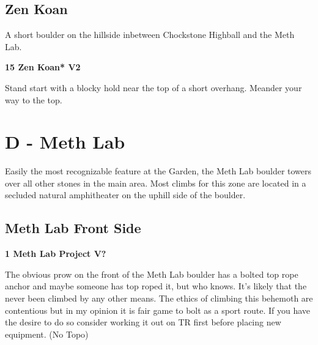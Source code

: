 \begin{multicols}{2}


		\needspace{1.5cm}
		\subsection*{Zen Koan}\label{bf:Zen Koan}
		A short boulder on the hillside inbetween Chockstone Highball and the Meth Lab.\\
	
		
			
			\needspace{1.5cm}
\label{rt:Zen Koan}
\colorbox{green!20}{
\parbox{0.95\linewidth}{
\textbf{
15 Zen Koan* V2  
}}}

			\begin{adjustwidth}{0.5cm}{}			
			Stand start with a blocky hold near the top of a short overhang. Meander your way to the top.
			\end{adjustwidth}
			
			
		
	
\newpage


		\section{D - Meth Lab}\label{sa:Meth Lab}
	Easily the most recognizable feature at the Garden, the Meth Lab boulder towers over all other stones in the main area. Most climbs for this zone are located in a secluded natural amphitheater on the uphill side of the boulder.\\

	
	


		\needspace{1.5cm}
		\subsection*{Meth Lab Front Side}\label{bf:Meth Lab Front Side}
			
		
			
			\needspace{1.5cm}
\label{rt:Meth Lab Project}
\colorbox{black!20}{
\parbox{0.95\linewidth}{
\textbf{
1 Meth Lab Project V?  \warn\warn\warn
}}}

			\begin{adjustwidth}{0.5cm}{}			
			The obvious prow on the front of the Meth Lab boulder has a bolted top rope anchor and maybe someone has top roped it, but who knows. It's likely that the never been climbed by any other means. The ethics of climbing this behemoth are contentious but in my opinion it is fair game to bolt as a sport route. If you have the desire to do so consider working it out on TR first before placing new equipment. (No Topo)
			\end{adjustwidth}
			

\end{multicols}
